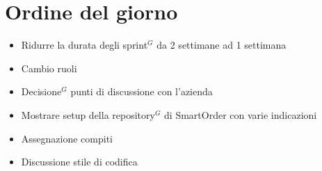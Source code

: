 \section*{Ordine del giorno}

\begin{itemize}
	\item Ridurre la durata degli sprint$^G$ da 2 settimane ad 1 settimana
	\item Cambio ruoli
	\item Decisione$^G$ punti di discussione con l'azienda
	\item Mostrare setup della repository$^G$ di SmartOrder con varie indicazioni
	\item Assegnazione compiti
	\item Discussione stile di codifica
\end{itemize}

